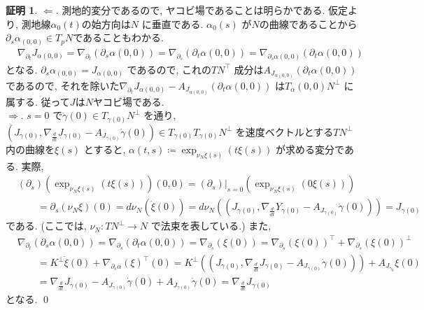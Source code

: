 \documentclass[10pt, fleqn, label-section=none]{bxjsarticle}
\theoremstyle{definition}
\newtheorem*{pf*}{証明}
\newcommand{\naraba}{\Rightarrow}
\newcommand{\gyaku}{\Leftarrow}
\renewcommand{\-}{\hyphen}
\begin{document}
\begin{pf*}
$\gyaku.$ 測地的変分であるので, ヤコビ場であることは明らかである. 仮定より, 測地線$\alpha_0 (t)$の始方向は$N$ に垂直である. $\alpha_0(s)$ が$N$の曲線であることから$\partial_s \alpha_(0,0) \in T_p N$であることもわかる. 
\begin{align*} &\nabla_{\partial_t} J_{\alpha{(0,0)} } = \nabla_{\partial_t} (\partial_s \alpha(0,0)) = \nabla_{\partial_s} (\partial_t \alpha(0,0)) = \nabla_{\partial_s \alpha{(0,0)} } (\partial_t \alpha(0,0)) \end{align*}
となる.  $\partial_s \alpha_{(0,0)} = J_{\alpha(0,0)}$ であるので, これの$TN^ \top$ 成分は$A_{J_{\alpha(0,0)}} (\partial_t \alpha(0,0))$ であるので, それを除いた$\nabla_{\partial_t} J_{\alpha{(0,0)} } - A_{J_{\alpha(0,0)}} (\partial_t \alpha(0,0))$ は$T_\alpha(0,0) N^\perp$ に属する. 従って$J$は$N$ヤコビ場である. \\
$\naraba.$ $s = 0$ で$\dot \gamma(0) \in T_{\gamma(0)} N^\perp  $ を通り, $(J_{\gamma(0)}, \nabla_{\frac{d}{dt} } J_{\gamma (0) } - A_{J_{\gamma(0)} } \dot \gamma (0)  ) \in T_{\dot \gamma(0) } T_{\gamma(0) }N ^\perp$ を速度ベクトルとする$TN^\perp$ 内の曲線を$\xi (s)$ とすると, $\alpha (t,s) \coloneqq \exp_{\nu_N  \xi (s) } (t \xi (s))$ が求める変分である. 実際, 
\begin{align*} &(\partial_s)(\exp_{\nu_N  \xi (s) } (t \xi (s))) (0, 0) = (\partial_s)|_{s = 0} (\exp_{\nu_N  \xi (s) } (0 \xi (s))) \\ &\quad \quad = \partial_s (\nu_N \xi) (0) = d\nu_N (\dot \xi (0) ) = d \nu_N ( (J_{\gamma(0)}, \nabla_{\frac{d}{dt} } Y_{\gamma (0) } - A_{J_{\gamma(0)} } \dot \gamma (0)  ) ) = J_{\gamma(0)} \end{align*}
である. (ここでは, $\nu_N: TN^\perp \rightarrow N$ で法束を表している.) また, 
\begin{align*} &\nabla_{\partial_t} (\partial_s \alpha (0,0)) = \nabla_{\partial_s} (\partial_t \alpha (0,0)) = \nabla_{\partial_s} (\xi (0)) = \nabla_{\partial_s} (\xi (0)) ^\top + \nabla_{\partial_s} (\xi (0)) ^\perp \\&\quad \quad  = K^\perp  \dot \xi (0) + \nabla_{\partial_s \alpha } (\xi) ^\top (0) = K^\perp ( (J_{\gamma(0)}, \nabla_{\frac{d}{dt} } J_{\gamma (0) } - A_{J_{\gamma(0)} } \dot \gamma (0)  ) ) + A_{J_{\gamma_0}} \xi (0) \\& \quad \quad =  \nabla_{\frac{d}{dt} } J_{\gamma (0) } - A_{J_{\gamma(0)} } \dot \gamma (0)  +  A_{J_{\gamma(0)} } \dot \gamma (0) = \nabla_{\frac{d}{dt} } J_{\gamma (0) }  \end{align*}
となる.  
\qed
\end{pf*}
\end{document}
